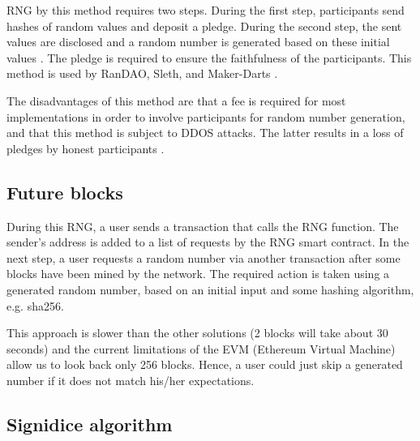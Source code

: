\documentclass[12pt]{article}
\begin{document}
RNG by this method requires two steps. During the first step, participants send hashes of random values and deposit a pledge. During the second step, the sent values are disclosed and a random number is generated based on these initial values  \cite{Dao_Casino_Ksenya_Serova_2017_Jun_27}. The pledge is required to ensure the faithfulness of the participants. This method is used by RanDAO, Sleth, and Maker-Darts  \cite{Dao_Casino_Ksenya_Serova_2017_Jun_27}.\par

The disadvantages of this method are that a fee is required for most implementations in order to involve participants for random number generation, and that this method is subject to DDOS attacks. The latter results in a loss of pledges by honest participants  \cite{Dao_Casino_Ksenya_Serova_2017_Jun_27}.\par


\vspace{\baselineskip}
\subsection{Future blocks}
\label{Future blocks}  \par

During this RNG, a user sends a transaction that calls the RNG function. The sender's address is added to a list of requests by the RNG smart contract. In the next step, a user requests a random number via another transaction after some blocks have been mined by the network. The required action is taken using a generated random number, based on an initial input and some hashing algorithm, e.g. sha256.\par

This approach is slower than the other solutions (2 blocks will take about 30 seconds) and the current limitations of the EVM (Ethereum Virtual Machine) allow us to look back only 256 blocks. Hence, a user could just skip a generated number if it does not match his/her expectations.\par

\vspace{\baselineskip}
\subsection{Signidice algorithm}
\label{Signidice algorithm}  \par
\end{document}
